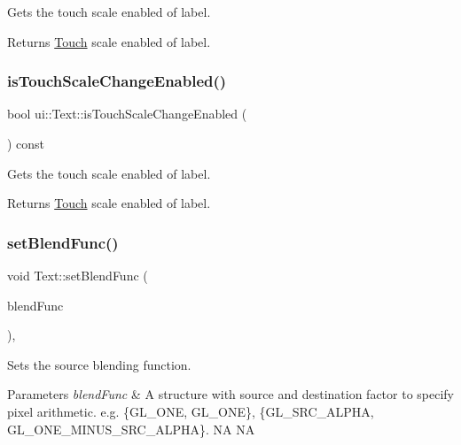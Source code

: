 Gets the touch scale enabled of label.

\begin{DoxyReturn}{Returns}
\hyperlink{classTouch}{Touch} scale enabled of label. 
\end{DoxyReturn}
\mbox{\label{classui_1_1Text_abb93684d87f2267726088ecc0beb96e4}} 
\subsubsection{\texorpdfstring{is\+Touch\+Scale\+Change\+Enabled()}{isTouchScaleChangeEnabled()}\hspace{0.1cm}{\footnotesize\ttfamily [2/2]}}
{\footnotesize\ttfamily bool ui\+::\+Text\+::is\+Touch\+Scale\+Change\+Enabled (\begin{DoxyParamCaption}{ }\end{DoxyParamCaption}) const}

Gets the touch scale enabled of label.

\begin{DoxyReturn}{Returns}
\hyperlink{classTouch}{Touch} scale enabled of label. 
\end{DoxyReturn}
\mbox{\label{classui_1_1Text_a68bf2951330099b3a45605e9c391a437}} 
\subsubsection{\texorpdfstring{set\+Blend\+Func()}{setBlendFunc()}}
{\footnotesize\ttfamily void Text\+::set\+Blend\+Func (\begin{DoxyParamCaption}\item[{const \hyperlink{structBlendFunc}{Blend\+Func} \&}]{blend\+Func }\end{DoxyParamCaption})\hspace{0.3cm}{\ttfamily [override]}, {\ttfamily [virtual]}}

Sets the source blending function.


\begin{DoxyParams}{Parameters}
{\em blend\+Func} & A structure with source and destination factor to specify pixel arithmetic. e.\+g. \{G\+L\+\_\+\+O\+NE, G\+L\+\_\+\+O\+NE\}, \{G\+L\+\_\+\+S\+R\+C\+\_\+\+A\+L\+P\+HA, G\+L\+\_\+\+O\+N\+E\+\_\+\+M\+I\+N\+U\+S\+\_\+\+S\+R\+C\+\_\+\+A\+L\+P\+HA\}.  NA  NA \\
\hline
\end{DoxyParams}
\mbox{\label{classui_1_1Text_ac8fe6b63731d42503f6bb73b00d3d40d}} 
